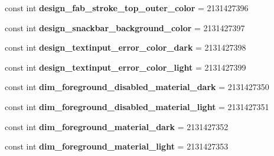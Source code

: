 \begin{DoxyCompactItemize}
\mbox{\label{class_pinned_app_1_1_droid_1_1_resource_1_1_color_a8c80b229ac5a1a60130b80f31a73e9d7}} 
const int {\bfseries design\+\_\+fab\+\_\+stroke\+\_\+top\+\_\+outer\+\_\+color} = 2131427396
\item 
\mbox{\label{class_pinned_app_1_1_droid_1_1_resource_1_1_color_a2569b2bec6f5ff5e6b0b27a4a0ce656c}} 
const int {\bfseries design\+\_\+snackbar\+\_\+background\+\_\+color} = 2131427397
\item 
\mbox{\label{class_pinned_app_1_1_droid_1_1_resource_1_1_color_ab11b76286ba1b9bc651bef2f514fdce0}} 
const int {\bfseries design\+\_\+textinput\+\_\+error\+\_\+color\+\_\+dark} = 2131427398
\item 
\mbox{\label{class_pinned_app_1_1_droid_1_1_resource_1_1_color_a7ed4e0a764589442e523ac50e3a7b7cd}} 
const int {\bfseries design\+\_\+textinput\+\_\+error\+\_\+color\+\_\+light} = 2131427399
\item 
\mbox{\label{class_pinned_app_1_1_droid_1_1_resource_1_1_color_a0f5aecff063e7cb4500c7a12ea4ecc6c}} 
const int {\bfseries dim\+\_\+foreground\+\_\+disabled\+\_\+material\+\_\+dark} = 2131427350
\item 
\mbox{\label{class_pinned_app_1_1_droid_1_1_resource_1_1_color_a33a5dc2d8c563cddfc619701eca588b4}} 
const int {\bfseries dim\+\_\+foreground\+\_\+disabled\+\_\+material\+\_\+light} = 2131427351
\item 
\mbox{\label{class_pinned_app_1_1_droid_1_1_resource_1_1_color_a574ed8fe9e06af2b748f2fbb9df8ced2}} 
const int {\bfseries dim\+\_\+foreground\+\_\+material\+\_\+dark} = 2131427352
\item 
\mbox{\label{class_pinned_app_1_1_droid_1_1_resource_1_1_color_ac36392a69593cf83cbfd7e73519325be}} 
const int {\bfseries dim\+\_\+foreground\+\_\+material\+\_\+light} = 2131427353

\end{DoxyCompactItemize}
